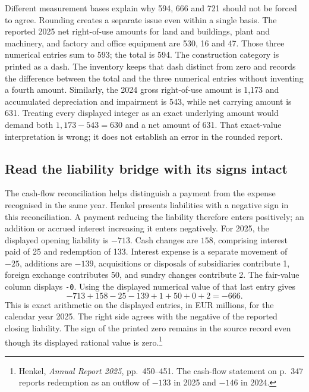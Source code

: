 Different measurement bases explain why 594, 666 and 721 should not be forced
to agree. Rounding creates a separate issue even within a single basis.
The reported 2025 net right-of-use amounts for land and buildings, plant and
machinery, and factory and office equipment are 530, 16 and 47. Those three
numerical entries sum to 593; the total is 594. The construction category is
printed as a dash. The inventory keeps that dash distinct from zero and records
the difference between the total and the three numerical entries without
inventing a fourth amount. Similarly, the 2024 gross right-of-use amount is
1,173 and accumulated depreciation and impairment is 543, while net carrying
amount is 631. Treating every displayed integer as an exact underlying amount
would demand both $1{,}173-543=630$ and a net amount of 631. That exact-value
interpretation is wrong; it does not establish an error in the rounded report.

\subsection{Read the liability bridge with its signs intact}

The cash-flow reconciliation helps distinguish a payment from the expense
recognised in the same year. Henkel presents liabilities with a negative sign
in this reconciliation. A payment reducing the liability therefore enters
positively; an addition or accrued interest increasing it enters negatively.
For 2025, the displayed opening liability is $-713$. Cash changes are $158$,
comprising interest paid of 25 and redemption of 133. Interest expense is a
separate movement of $-25$, additions are $-139$, acquisitions or disposals of
subsidiaries contribute 1, foreign exchange contributes 50, and sundry changes
contribute 2. The fair-value column displays \texttt{-0}.
Using the displayed numerical value of that last entry gives
\begin{equation}
\label{eq:henkel-displayed-liability-bridge}
 -713+158-25-139+1+50+0+2=-666.
\end{equation}
This is exact arithmetic on the displayed entries, in EUR millions, for the
calendar year 2025. The right side agrees with the negative of the reported
closing liability. The sign of the printed zero remains in the source record
even though its displayed rational value is zero.\footnote{Henkel,
\emph{Annual Report 2025}, pp.~450--451. The cash-flow statement on p.~347
reports redemption as an outflow of $-133$ in 2025 and $-146$ in 2024.}

